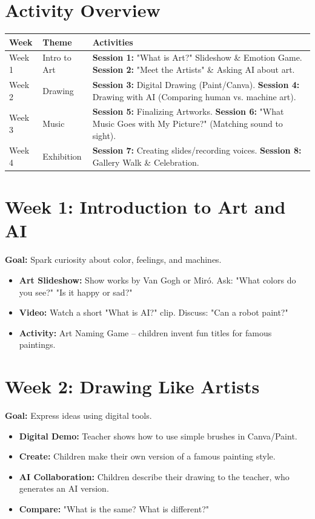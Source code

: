 \documentclass[11pt, a4paper]{article}
\begin{document}
\section*{Activity Overview}
\begingroup
\small
\begin{tabularx}{\textwidth}{|l|l|L|}
    \hline
     \textbf{Week} & \textbf{Theme} & \textbf{Activities} \\ \hline
    Week 1 & Intro to Art & \textbf{Session 1:} "What is Art?" Slideshow \& Emotion Game. \newline \textbf{Session 2:} "Meet the Artists" \& Asking AI about art. \\ \hline
    Week 2 & Drawing & \textbf{Session 3:} Digital Drawing (Paint/Canva). \newline \textbf{Session 4:} Drawing with AI (Comparing human vs. machine art). \\ \hline
    Week 3 & Music & \textbf{Session 5:} Finalizing Artworks. \newline \textbf{Session 6:} "What Music Goes with My Picture?" (Matching sound to sight). \\ \hline
    Week 4 & Exhibition & \textbf{Session 7:} Creating slides/recording voices. \newline \textbf{Session 8:} Gallery Walk \& Celebration. \\ \hline
\end{tabularx}
\endgroup

\section{Week 1: Introduction to Art and AI}
\textbf{Goal:} Spark curiosity about color, feelings, and machines.
\begin{itemize}
    \item \textbf{Art Slideshow:} Show works by Van Gogh or Miró. Ask: "What colors do you see?" "Is it happy or sad?"
    \item \textbf{Video:} Watch a short "What is AI?" clip. Discuss: "Can a robot paint?"
    \item \textbf{Activity:} Art Naming Game – children invent fun titles for famous paintings.
\end{itemize}

\section{Week 2: Drawing Like Artists}
\textbf{Goal:} Express ideas using digital tools.
\begin{itemize}
    \item \textbf{Digital Demo:} Teacher shows how to use simple brushes in Canva/Paint.
    \item \textbf{Create:} Children make their own version of a famous painting style.
    \item \textbf{AI Collaboration:} Children describe their drawing to the teacher, who generates an AI version.
    \item \textbf{Compare:} "What is the same? What is different?"
\end{itemize}
\end{document}
